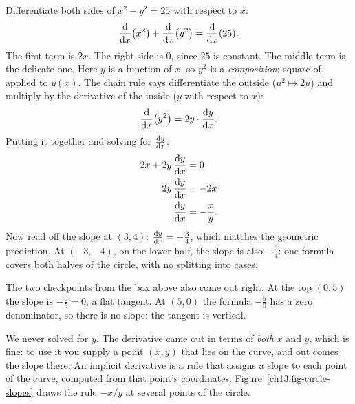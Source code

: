 \begin{example}
\label{ch13:ex-circle}
Differentiate both sides of $x^2 + y^2 = 25$ with respect to $x$:
\[
\frac{\mathrm{d}}{\mathrm{d} x}\!\left(x^2\right) + \frac{\mathrm{d}}{\mathrm{d} x}\!\left(y^2\right) = \frac{\mathrm{d}}{\mathrm{d} x}(25).
\]
The first term is $2x$. The right side is $0$, since $25$ is constant. The middle term is the
delicate one. Here $y$ is a function of $x$, so $y^2$ is a \emph{composition}: square-of, applied to
$y(x)$. The chain rule says differentiate the outside ($u^2 \mapsto 2u$) and multiply by the
derivative of the inside ($y$ with respect to $x$):
\[
\frac{\mathrm{d}}{\mathrm{d} x}\!\left(y^2\right) = 2y\cdot\frac{\mathrm{d} y}{\mathrm{d} x}.
\]
Putting it together and solving for $\frac{\mathrm{d} y}{\mathrm{d} x}$:
\begin{align*}
2x + 2y\,\frac{\mathrm{d} y}{\mathrm{d} x} &= 0 \\
2y\,\frac{\mathrm{d} y}{\mathrm{d} x} &= -2x \\
\frac{\mathrm{d} y}{\mathrm{d} x} &= -\frac{x}{y}.
\end{align*}
Now read off the slope at $(3,4)$: $\frac{\mathrm{d} y}{\mathrm{d} x} = -\tfrac{3}{4}$, which matches the geometric
prediction. At $(-3,-4)$, on the lower half, the slope is also $-\tfrac{3}{4}$: one formula covers
both halves of the circle, with no splitting into cases.

The two checkpoints from the box above also come out right. At the top $(0,5)$ the slope is
$-\tfrac{0}{5} = 0$, a flat tangent. At $(5,0)$ the formula $-\tfrac{5}{0}$ has a zero denominator,
so there is no slope: the tangent is vertical.
\end{example}

We never solved for $y$. The derivative came out in terms of \emph{both}
$x$ and $y$, which is fine: to use it you supply a point $(x,y)$ that lies on the curve,
and out comes the slope there. An implicit derivative is a rule that assigns a slope to each point
of the curve, computed from that point's coordinates. Figure~\ref{ch13:fig-circle-slopes} draws the
rule $-x/y$ at several points of the circle.

